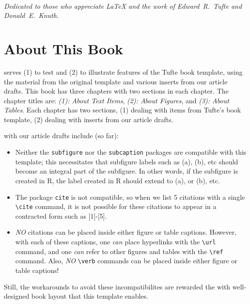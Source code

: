 \documentclass{tufte-book}
\begin{document}
\tableofcontents

\listoffigures

\listoftables

\listofalgorithms

\cleardoublepage
~\vfill
\begin{doublespace}
\noindent\fontsize{18}{22}\selectfont\itshape
\nohyphenation
Dedicated to those who appreciate \LaTeX{} 
and the work of \mbox{Edward R.~Tufte} 
and \mbox{Donald E.~Knuth}.
\end{doublespace}
\vfill
\vfill

\cleardoublepage
\chapter*{About This Book}
\vspace*{-7ex}
 serves (1) to test and (2) to illustrate features of the Tufte book template,
using the material from the original template and 
various inserts from our article drafts. 
This book has three chapters with two sections in each chapter.
The chapter titles are:
{\em (1): About Text Items}, 
{\em (2): About Figures}, and
{\em (3): About Tables}.
Each  chapter has two sections, 
(1) dealing with items from Tufte's book template,
(2) dealing with inserts from our article drafts.

\vspace*{-0ex}
 with our article drafts include (so far):
\begin{itemize}
\item
Neither the {\tt subfigure} nor the {\tt subcaption} packages are compatible with this template;
this necessitates that subfigure labels such as (a), (b), etc should become an integral part of
the subfigure. In other words, if the subfigure is created in R, the label created in R should 
extend to (a), or (b), etc.
\item
The package {\tt cite} is not compatible, so 
when we list 5 citations with a single \verb+\cite+ command, 
it is not possible for these citations to appear in a contracted form such as [1]-[5].
\item
{\em NO} citations can be placed inside either figure or table captions.
However, with each of these captions, one {\em can} place hyperlinks with the \verb+\url+ command,
and one {\em can} refer to other figures and tables with the \verb+\ref+ command.
Also, {\em NO} \verb+\verb+ commands can be placed inside either figure or table captions!
\end{itemize}
Still, the workarounds to avoid these incompatibilites are rewarded the with well-designed book layout that this template enables.
\end{document}
